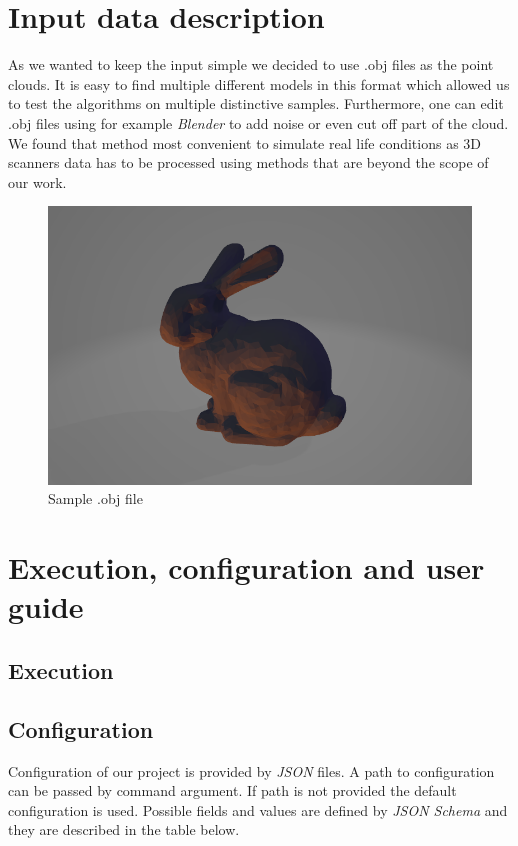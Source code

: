 \documentclass[titlepage]{article}
\begin{document}
\section{Input data description}

As we wanted to keep the input simple we decided to use .obj files as the point clouds. It is easy to find multiple different models in this format which allowed us to test the algorithms on multiple distinctive samples. Furthermore, one can edit .obj files using for example \textit{Blender} to add noise or even cut off part of the cloud. We found that method most convenient to simulate real life conditions as 3D scanners data has to be processed using methods that are beyond the scope of our work.

\begin{figure}[H]
\includegraphics[width=\textwidth]{ms-bunny.png}
\caption{Sample .obj file}
\end{figure}

\section{Execution, configuration and user guide}
\subsection{Execution}
\subsection{Configuration}
Configuration of our project is provided by \textit{JSON} files. A path to configuration can be passed by command argument. If path is not provided the default configuration is used. Possible fields and values are defined by \textit{JSON Schema} and they are described in the table below.
\end{document}
